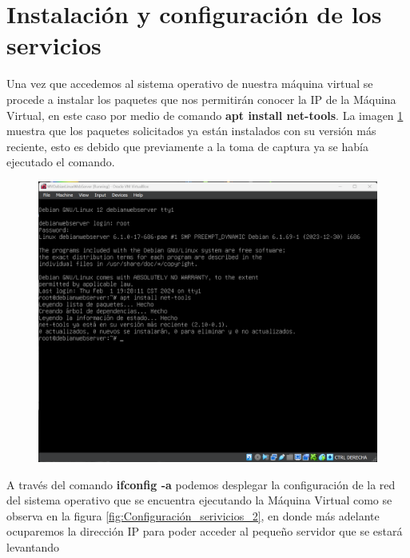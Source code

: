 \documentclass[12pt,a4paper]{article}
\begin{document}
\section{Instalación y configuración de los servicios}

Una vez que accedemos al sistema operativo de nuestra máquina virtual se procede a instalar los paquetes que nos permitirán conocer la IP de la Máquina Virtual, en este caso por medio de comando \textbf{apt install net-tools}. La imagen \ref{fig:Configuración_serivicios_1} muestra que los paquetes solicitados ya están instalados con su versión más reciente, esto es debido que previamente a la toma de captura ya se había ejecutado el comando.


\begin{figure}[H]
    \centering
    \includegraphics[width=1\linewidth]{M3_Virtualización_y_Contenedores/Tarea_2_Máquina_Virtual_Local/reporte/figuras/4-1_Configuración_servicios.png}
    \label{fig:Configuración_serivicios_1}
\end{figure}


A través del comando \textbf{ifconfig -a} podemos desplegar la configuración de la red del sistema operativo que se encuentra ejecutando la Máquina Virtual como se observa en la figura \ref{fig:Configuración_serivicios_2}, en donde más adelante ocuparemos la dirección IP para poder acceder al pequeño servidor que se estará levantando
\end{document}
